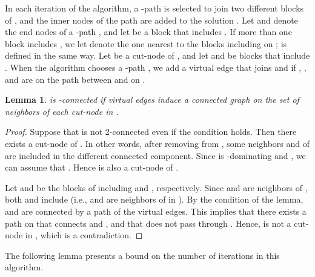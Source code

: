\documentclass[11pt]{article}
\newtheorem{lemma}{Lemma}
\begin{document}
  In each iteration of the algorithm, a -path is selected to
  join two different blocks of ,
  and the inner nodes of the path are
  added to the solution .
  Let  and  denote the end nodes of a -path , and 
  let  be a block that includes .
  If more than one block includes , we let 
  denote the one nearest to the blocks including  on ;
   is defined in the same way.
  Let  be a cut-node of ,
  and let  and  be blocks that include .
  When the algorithm chooses a -path ,
  we add a virtual edge 
  that joins
   and  
  if , , and  are on the path between
   and  on .
  
  \begin{lemma}
    is -connected if
   virtual edges induce a connected graph
   on the set of neighbors of
    each cut-node  in .
  \end{lemma}
  \begin{proof}
   Suppose that  is not 2-connected even if the condition holds. Then there 
   exists a cut-node  of .
   In other words, after removing  from , some neighbors  and  of 
   are included in the different connected component.
   Since  is -dominating and , we can assume that .
   Hence  is also a cut-node of .
      
   Let  and  be the blocks of  including  and , respectively. 
   Since  and  are neighbors of , both  and  include  (i.e., 
    and  are neighbors of  in ).
   By the condition of the lemma,
    and  are connected by a path of the virtual edges. 
   This implies that there exists a path on  that connects  and ,
   and that does not pass through .
   Hence,  is not a cut-node in , which is a contradiction.
  \end{proof}

  The following lemma presents a bound on the number of iterations in this algorithm.
 
\end{document}
